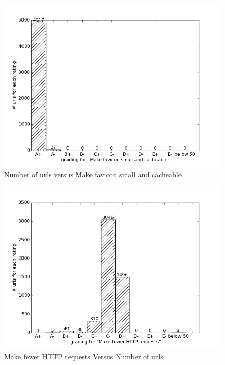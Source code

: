 \documentclass[conference]{IEEEtran}
\begin{document}
\begin{figure}[ht]
 \centering
  \includegraphics[scale=0.33]{new-img-jpg/vlab-jpg/Make favicon small and cacheable.jpg}
\caption{Number of urls versus Make favicon small and cacheable}	
\label{fig:favicon}
\end{figure}

\begin{figure}[ht]
 \centering
  \includegraphics[scale=0.33]{new-img-jpg/vlab-jpg/Make fewer HTTP requests.jpg}
\caption{Make fewer HTTP requests Versus Number of urls}	
\label{fig:httpr}
\end{figure}
\end{document}

